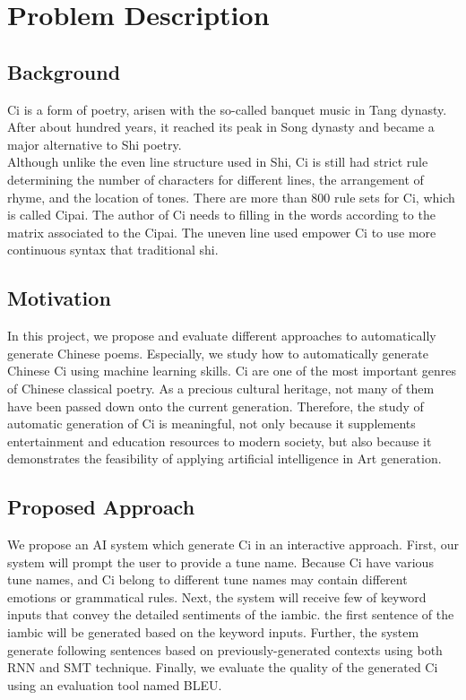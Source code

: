\section{Problem Description}
\subsection{Background}
Ci is a form of poetry, arisen with the so-called banquet music in Tang dynasty. After about hundred years, it reached its peak in Song dynasty and became a major alternative to Shi poetry\cite{cai2008chinesepoetry}.\\

Although unlike the even line structure used in Shi, Ci is still had strict rule determining the number of characters for different lines, the arrangement of rhyme, and the location of tones. There are more than 800 rule sets for Ci, which is called Cipai\cite{wikici}. The author of Ci needs to filling in the words according to the matrix associated to the Cipai. The uneven line used empower Ci to use more continuous syntax that traditional shi\cite{cai2008chinesepoetry}.
\subsection{Motivation}
In this project, we propose and evaluate different approaches to automatically generate Chinese poems. 
%
Especially, we study how to automatically generate Chinese Ci using machine learning skills.
%
Ci are one of the most important genres of Chinese classical poetry. 
%
As a precious cultural heritage, not many of them have been passed down onto the current generation.
%
Therefore, the study of automatic generation of Ci is meaningful, not only because it supplements entertainment and education resources to modern society, but also because it demonstrates the feasibility of applying artificial intelligence in Art generation. 
%
\subsection{Proposed Approach}
We propose an AI system which generate Ci in an interactive approach.
%
First, our system will prompt the user to provide a tune name.
%
Because Ci have various tune names, and Ci belong to different tune names may contain different emotions or grammatical rules.
%
Next, the system will receive few of keyword inputs that convey the detailed sentiments of the iambic.
%
the first sentence of the iambic will be generated based on the keyword inputs.
%
Further, the system generate following sentences based on previously-generated contexts using both RNN and SMT technique.
%
Finally, we evaluate the quality of the generated Ci using an evaluation tool named BLEU.

